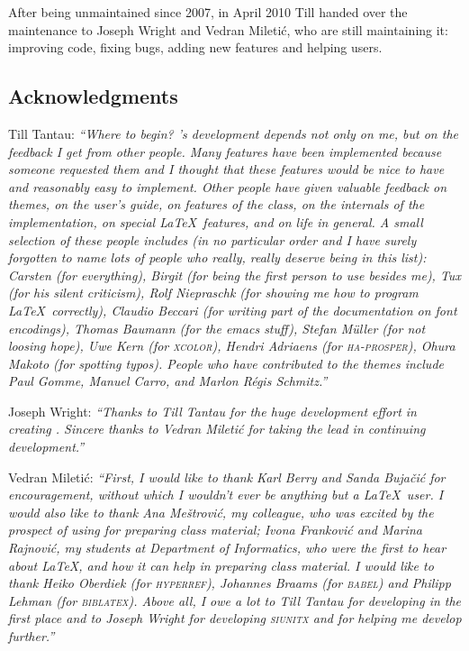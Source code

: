 After being unmaintained since 2007, in April 2010 Till handed over the maintenance to Joseph Wright and Vedran Mileti\'c, who are still maintaining it: improving code, fixing bugs, adding new features and helping users.


\subsection{Acknowledgments}

Till Tantau: \emph{``Where to begin? \textsl{\beamer}'s development depends not only on me, but on the feedback I get from other people. Many features have been implemented because someone requested them and I thought that these features would be nice to have and reasonably easy to implement. Other people have given valuable feedback on themes, on the user's guide, on features of the class, on the internals of the implementation, on special \LaTeX\ features, and on life in general. A small selection of these people includes (in no particular order and I have surely forgotten to name lots of people who really, really deserve being in this list): Carsten (for everything), Birgit (for being the first person to use \textsl{\beamer} besides me), Tux (for his silent criticism), Rolf Niepraschk (for showing me how to program \LaTeX\ correctly), Claudio Beccari (for writing part of the documentation  on font encodings), Thomas Baumann (for the emacs stuff), Stefan M\"uller (for not loosing hope), Uwe Kern (for \textsl{\textsc{xcolor}}), 
Hendri Adriaens (for \textsl{\textsc{ha-prosper}}), Ohura Makoto (for spotting typos). People who have contributed to the themes include Paul Gomme, Manuel Carro, and Marlon R\'egis Schmitz.''}

Joseph Wright: \emph{``Thanks to Till Tantau for the huge development effort in creating \textsl{\beamer}. Sincere thanks to Vedran Mileti\'c for taking the lead in continuing development.''}

Vedran Mileti\'c: \emph{``First, I would like to thank Karl Berry and Sanda Buja\v ci\'c for encouragement, without which I wouldn't ever be anything but a \LaTeX\ user. I would also like to thank Ana Me\v strovi\'c, my colleague, who was excited by the prospect of using \textsl{\beamer} for preparing class material; Ivona Frankovi\'c and Marina Rajnovi\'c, my students at Department of Informatics, who were the first to hear about \LaTeX, \textsl{\beamer} and how it can help in preparing class material. I would like to thank Heiko Oberdiek (for \textsl{\textsc{hyperref}}), Johannes Braams (for \textsl{\textsc{babel}}) and Philipp Lehman (for \textsl{\textsc{biblatex}}). Above all, I owe a lot to Till Tantau for developing \textsl{\beamer} in the first place and to Joseph Wright for developing \textsl{\textsc{siunitx}} and for helping me develop \textsl{\beamer} further.''}


